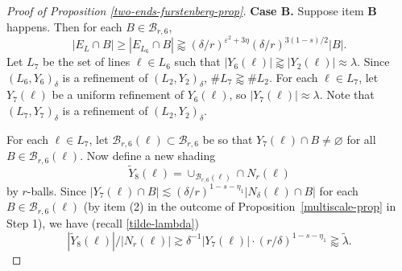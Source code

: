 \documentclass{amsart}
\numberwithin{equation}{section}
\newcommand{\de}{\delta}
\newcommand{\e}{\varepsilon}
\newcommand{\la}{\lambda}
\newcommand{\cb}{\mathcal B}
\begin{document}
\begin{proof}[Proof of Proposition \ref{two-ends-furstenberg-prop}]
\smallskip

{\bf Case B.}  Suppose item {\bf B} happens. Then for each $B\in\cb_{r,6}$,
\begin{equation}
\label{high-density-in-r-ball}
    |E_{L}\cap B|\geq |E_{L_6}\cap B|\gtrapprox (\de/r)^{\e^2+3\eta}(\de/r)^{3(1-s)/2}|B|.
\end{equation}
Let $L_7$ be the set of lines $\ell\in L_6$ such that $|Y_6(\ell)| \gtrapprox |Y_2(\ell)|\approx\la$.
Since $(L_6,Y_6)_\de$ is a refinement of $(L_2,Y_2)_\de$,
$\#L_7 \gtrapprox \#L_2$. 
For each $\ell\in L_7$, let  $Y_7(\ell)$ be a uniform refinement of $ Y_6(\ell)$, so $|Y_7(\ell)|\approx \la$.
Note that $(L_7,Y_7)_\de$ is a refinement of $(L_2,Y_2)_\de$. 



For each $\ell\in L_7$, let $\cb_{r,6}(\ell)\subset\cb_{r,6}$ be so that $Y_7(\ell)\cap B\not=\varnothing$ for all $B\in\cb_{r,6}(\ell)$.
Now define a new shading 
\begin{equation}
    \tilde Y_8(\ell)=\cup_{\cb_{r,6}(\ell)}\cap N_{r}(\ell)
\end{equation}
by $r$-balls. 
Since $|Y_7(\ell)\cap B|\lesssim (\de/r)^{1-s-\eta_1}|N_\de(\ell)\cap B|$ for each $B\in \cb_{r, 6}(\ell)$ (by item (2) in the outcome of Proposition~\ref{multiscale-prop} in Step 1), we have (recall \eqref{tilde-lambda})
\begin{equation}
  |\tilde Y_8(\ell)|/ |N_r(\ell)| \gtrsim \de^{-1}|Y_7(\ell)|\cdot (r/\de)^{1-s-\eta_1}\gtrapprox \tilde \la.
\end{equation}



\end{proof}
\end{document}

